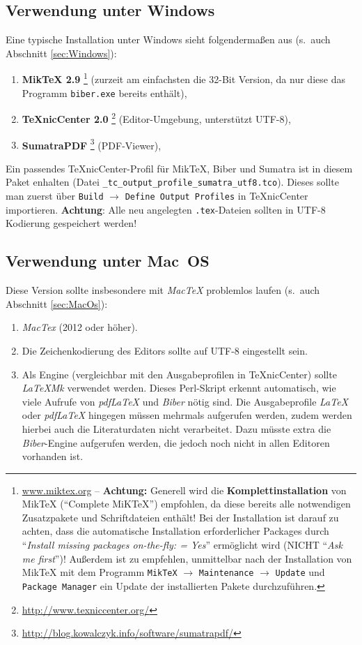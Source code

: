 \subsection{Verwendung unter Windows}

Eine typische Installation unter Windows sieht folgendermaßen aus
(s.\ auch Abschnitt \ref{sec:Windows}):
%
\begin{enumerate}
\item \textbf{MikTeX 2.9}%
	\footnote{\url{www.miktex.org} -- \textbf{Achtung:} 
	Generell wird die \textbf{Komplett\-installation} von MikTeX ("`Complete MiKTeX"') empfohlen, 
	da diese bereits alle notwendigen Zusatzpakete und Schriftdateien enthält! 
	Bei der Installation ist darauf zu achten, 
	dass die automatische Installation erforderlicher Packages 
	durch "`\emph{Install missing packages on-the-fly: = Yes}"' ermöglicht wird (NICHT "`\emph{Ask me first}"')!
	Außerdem ist zu empfehlen, unmittelbar nach der Installation von MikTeX mit dem Programm
	\texttt{MikTeX} $\to$ \texttt{Maintenance} $\to$ \texttt{Update} und \texttt{Package Manager} 
	ein Update der installierten Pakete durchzuführen.}
	(zurzeit am einfachsten die 32-Bit Version, da nur diese das Programm \texttt{biber.exe} 
	bereits enthält),
\item \textbf{TeXnicCenter 2.0}%
	\footnote{\url{http://www.texniccenter.org/}}
	(Editor-Umgebung, unterstützt UTF-8),
\item \textbf{SumatraPDF}%
	\footnote{\url{http://blog.kowalczyk.info/software/sumatrapdf/}} 
	(PDF-Viewer),
\end{enumerate}
%
Ein passendes TeXnicCenter-Profil für MikTeX, Biber und Sumatra ist in diesem Paket enhalten
(Datei \verb!_tc_output_profile_sumatra_utf8.tco!). Dieses sollte man zuerst
über \texttt{Build} $\to$ \texttt{Define Output Profiles} in TeXnicCenter importieren.
\textbf{Achtung}: Alle neu angelegten \texttt{.tex}-Dateien sollten in UTF-8 Kodierung gespeichert werden!




\subsection{Verwendung unter Mac~OS}


Diese Version sollte insbesondere mit \emph{MacTeX} problemlos laufen (s.\ auch Abschnitt \ref{sec:MacOs}):
\begin{enumerate}
\item 
	\emph{MacTex} (2012 oder höher).
\item 
	Die Zeichenkodierung des Editors sollte auf UTF-8 eingestellt sein.
\item 
	Als Engine (vergleichbar mit den Ausgabeprofilen in TeXnicCenter) sollte \emph{LaTeXMk} verwendet werden. 
	Dieses Perl-Skript erkennt automatisch, wie viele Aufrufe von \emph{pdfLaTeX} und \emph{Biber} nötig sind. 
	Die Ausgabeprofile \emph{LaTeX} oder \emph{pdfLaTeX} hingegen müssen mehrmals aufgerufen werden, 
	zudem werden hierbei auch die Literaturdaten nicht verarbeitet. Dazu müsste extra die \emph{Biber}-Engine 
	aufgerufen werden, 	die jedoch noch nicht in allen Editoren vorhanden ist.
\end{enumerate}


